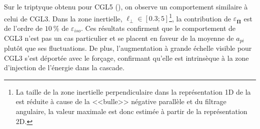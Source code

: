 
Sur le triptyque obtenu pour CGL5 (), on observe un comportement similaire à celui de CGL3. Dans la zone inertielle, $\ell_{\perp} \in [\num{0.3};\num{5}]$\footnote{La taille de la zone inertielle perpendiculaire dans la représentation \acs{1D} de la  est réduite à cause de la <<bulle>> négative parallèle et du filtrage angulaire, la valeur maximale est donc estimée à partir de la représentation \acs{2D}.}, la contribution de  $\varepsilon_{\overline{\boldsymbol{\Pi}}}$ est de l'ordre de $\SI{10}{\%}$ de $\varepsilon_{iso}$. Ces résultats confirment que le comportement de CGL3 n'est pas un cas particulier et se placent en faveur de la moyenne de $a_{pi}$ plutôt que ses fluctuations. De plus, l'augmentation à  grande échelle visible pour CGL3 s'est déportée avec le forçage, confirmant qu'elle est intrinsèque à la zone d'injection de l'énergie dans la cascade.  


